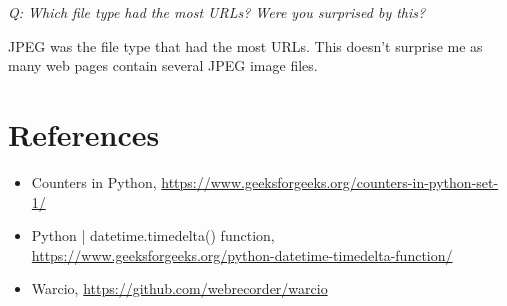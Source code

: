 \documentclass[12pt]{article}
\begin{document}
\emph{Q: Which file type had the most URLs? Were you surprised by this?}

JPEG was the file type that had the most URLs. This doesn't surprise me as many web pages contain several JPEG image files.


\section*{References}

\begin{itemize}
    \item {Counters in Python, \url{https://www.geeksforgeeks.org/counters-in-python-set-1/}}
    \item{Python | datetime.timedelta() function, \url{https://www.geeksforgeeks.org/python-datetime-timedelta-function/}}
    \item {Warcio, \url{https://github.com/webrecorder/warcio}}
\end{itemize}
\end{document}
